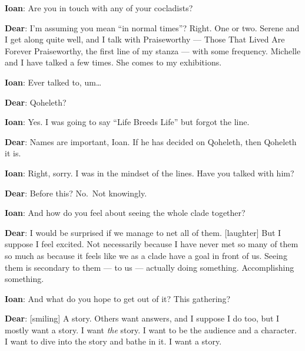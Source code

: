 \textbf{Ioan}: Are you in touch with any of your cocladists?

\textbf{Dear}: I'm assuming you mean ``in normal times''? Right. One or two. Serene and I get along quite well, and I talk with Praiseworthy — Those That Lived Are Forever Praiseworthy, the first line of my stanza — with some frequency. Michelle and I have talked a few times. She comes to my exhibitions.

\textbf{Ioan}: Ever talked to, um\ldots{}

\textbf{Dear}: Qoheleth?

\textbf{Ioan}: Yes. I was going to say ``Life Breeds Life'' but forgot the line.

\textbf{Dear}: Names are important, Ioan. If he has decided on Qoheleth, then Qoheleth it is.

\textbf{Ioan}: Right, sorry. I was in the mindset of the lines. Have you talked with him?

\textbf{Dear}: Before this? No.~Not knowingly.

\textbf{Ioan}: And how do you feel about seeing the whole clade together?

\textbf{Dear}: I would be surprised if we manage to net all of them. {[}laughter{]} But I suppose I feel excited. Not necessarily because I have never met so many of them so much as because it feels like we as a clade have a goal in front of us. Seeing them is secondary to them — to us — actually doing something. Accomplishing something.

\textbf{Ioan}: And what do you hope to get out of it? This gathering?

\textbf{Dear}: {[}smiling{]} A story. Others want answers, and I suppose I do too, but I mostly want a story. I want \emph{the} story. I want to be the audience and a character. I want to dive into the story and bathe in it. I want a story.
